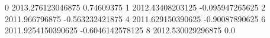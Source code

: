 0 2013.276123046875 0.74609375
1 2012.43408203125 -0.095947265625
2 2011.966796875 -0.563232421875
4 2011.629150390625 -0.90087890625
6 2011.9254150390625 -0.6046142578125
8 2012.530029296875 0.0
